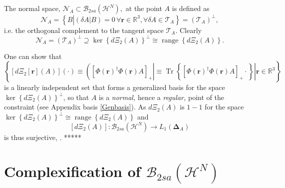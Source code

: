 \documentclass[aps,preprint]{revtex4}%
\begin{document}
The normal space, $\mathcal{N}_{A}\subset\mathcal{B}_{2sa}\left(
\mathcal{H}^{N}\right)  ,$ at the point $A$ is defined as
\begin{equation}
\mathcal{N}_{A}=\left\{  B\left\vert \left(  \left.  \delta A\right\vert
B\right)  =0\,\forall\boldsymbol{r\in}\mathbb{R}^{3},\forall\delta
A\in\mathcal{T}_{A}\right.  \right\}  =\left(  \mathcal{T}_{A}\right)  ^{\bot
},
\end{equation}
i.e. the orthogonal complement to the tangent space $\mathcal{T}_{A}.$ Clearly%
\begin{equation}
\mathcal{N}_{A}=\left(  \mathcal{T}_{A}\right)  ^{\bot}\supseteq\ker\left\{
d\Xi_{2}\left(  A\right)  \right\}  ^{\bot}\cong\operatorname{range}\left\{
d\Xi_{2}\left(  A\right)  \right\}  .
\end{equation}


One can show that $\left\{  \left.  \left[  d\Xi_{2}\left[  \boldsymbol{r}%
\right]  \left(  A\right)  \right]  \left(  \cdot\right)  \equiv\left(
\left[  \Phi\left(  \boldsymbol{r}\right)  ^{\dagger}\Phi\left(
\boldsymbol{r}\right)  A\right]  _{+}\right\vert \equiv\operatorname{Tr}%
\left\{  \left[  \Phi\left(  \boldsymbol{r}\right)  ^{\dagger}\Phi\left(
\boldsymbol{r}\right)  A\right]  _{+}\cdot\right\}  \right\vert
\boldsymbol{r\in}\mathbb{R}^{3}\right\}  $ is a linearly independent set that
forms a generalized basis for the space $\ker\left\{  d\Xi_{2}\left(
A\right)  \right\}  ^{\bot}$, so that $A$ is a \emph{normal, }hence a\emph{
regular, }\cite{Hestenes}\emph{ }point of the constraint (see Appendix basis
\ref{Genbasis}). As $d\Xi_{2}\left(  A\right)  $ is $1-1$ for the space
$\ker\left\{  d\Xi_{2}\left(  A\right)  \right\}  ^{\bot}\cong%
\operatorname{range}\left\{  d\Xi_{2}\left(  A\right)  \right\}  $ and
\begin{equation}
\left[  d\Xi_{2}\left(  A\right)  \right]  :\mathcal{B}_{2sa}\left(
\mathcal{H}^{N}\right)  \rightarrow L_{1}\left(  \boldsymbol{\Delta}%
_{A}\right)
\end{equation}
is thus surjective, . *****

\section{Complexification of $\mathcal{B}_{2sa}\left(  \mathcal{H}^{N}\right)
$ \label{Complex}}
\end{document}
